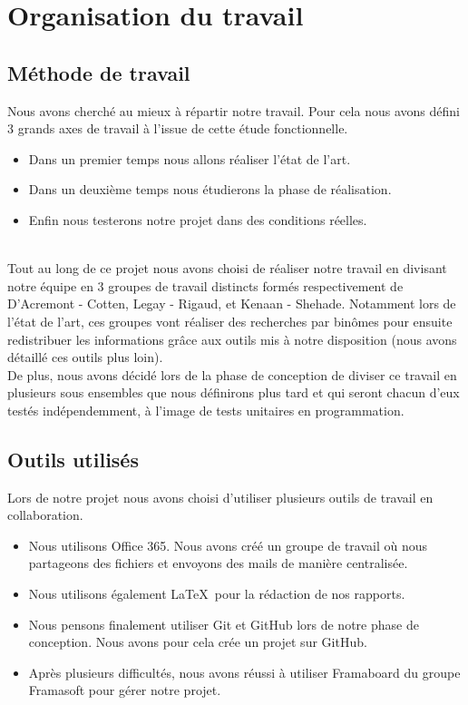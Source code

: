 
\chapter{Organisation du travail}


\section{Méthode de travail}

Nous avons cherché au mieux à répartir notre travail. Pour cela nous avons défini 3 grands axes de travail à l'issue de cette étude fonctionnelle.
\begin{itemize}
\item Dans un premier temps nous allons réaliser l'état de l'art.
\item Dans un deuxième temps nous étudierons la phase de réalisation.
\item Enfin nous testerons notre projet dans des conditions réelles.
\end{itemize}
~\\

Tout au long de ce projet nous avons choisi de réaliser notre travail en divisant notre équipe en 3 groupes de travail distincts formés respectivement de D'Acremont - Cotten, Legay - Rigaud, et Kenaan - Shehade. Notamment lors de l'état de l'art, ces groupes vont réaliser des recherches par binômes pour ensuite redistribuer les informations grâce aux outils mis à notre disposition (nous avons détaillé ces outils plus loin).
~\\

De plus, nous avons décidé lors de la phase de conception de diviser ce travail en plusieurs sous ensembles que nous définirons plus tard et qui seront chacun d'eux testés indépendemment, à l'image de tests unitaires en programmation.



\section{Outils utilisés}

Lors de notre projet nous avons choisi d'utiliser plusieurs outils de travail en collaboration.

\begin{itemize}
\item Nous utilisons Office 365. Nous avons créé un groupe de travail où nous partageons des fichiers et envoyons des mails de manière centralisée.
\item Nous utilisons également \LaTeX~pour la rédaction de nos rapports.
\item Nous pensons finalement utiliser Git et GitHub lors de notre phase de conception. Nous avons pour cela crée un projet sur GitHub.
\item Après plusieurs difficultés, nous avons réussi à utiliser Framaboard du groupe Framasoft pour gérer notre projet.
\end{itemize}

